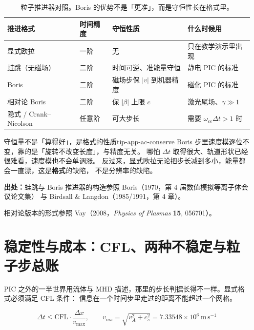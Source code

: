 \begin{table}[htbp]
\centering
\small
\caption{粒子推进器对照。Boris 的优势不是「更准」，而是守恒性长在格式里。}
\label{tab:app-ac-pusher}
\begin{tabular}{p{2.4cm}p{3.0cm}p{3.2cm}p{4.3cm}}
\toprule
推进格式 & 时间精度 & 守恒性质 & 什么时候用 \\
\midrule
显式欧拉 & 一阶 & 无 & 只在教学演示里出现 \\
蛙跳（无磁场） & 二阶 & 时间可逆、准能量守恒 & 静电 PIC 的标准 \\
Boris & 二阶 & 磁场步保 $|v|$ 到机器精度 & 磁化 PIC 的标准 \\
相对论 Boris & 二阶 & 保 $|\beta|$ 上限 $c$ & 激光尾场、$\gamma\gg1$ \\
隐式 / Crank--Nicolson & 任意阶 & 可大步长 & 需要 $\omega_{ce}\Delta t>1$ 时 \\
\bottomrule
\end{tabular}

\end{table}

\begin{tip}{守恒量不是「算得好」，是格式的性质}{tip-app-ac-conserve}
Boris 步里速度模逐位不变，靠的是「旋转不改变长度」，与精度无关。
哪怕 $\Delta t$ 取得很大、轨道形状已经很难看，速度模也不会单调涨。
反过来，显式欧拉无论把步长减到多小，能量都会一直漂，这是\textbf{格式}的缺陷，
不是分辨率的缺陷。
\end{tip}

{\footnotesize
\textbf{出处：}蛙跳与 Boris 推进器的构造参照 Boris（1970，第 4 届数值模拟等离子体会议论文集）
与 Birdsall \& Langdon（1985/1991，第 4 章）。

相对论版本的形式参照 Vay（2008，\emph{Physics of Plasmas} \textbf{15}, 056701）。
}

\section{稳定性与成本：CFL、两种不稳定与粒子步总账}
\label{sec:app-ac-cost}

PIC 之外的一半世界用流体与 MHD 描述，那里的步长判据长得不一样。显式格式必须满足 CFL 条件：
信息在一个时间步里走过的距离不能超过一个网格。

\begin{equation}
\Delta t\le \mathrm{CFL}\cdot\frac{\Delta x}{v_{\max}},
\qquad
v_{ms}=\sqrt{v_A^2+c_s^2}=7.33548\times10^{6}\ \mathrm{m\,s^{-1}}
\label{eq:app-ac-cfl}
\end{equation}

